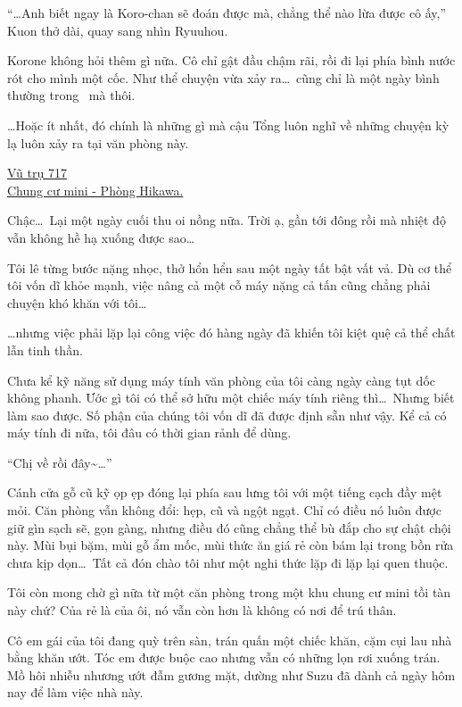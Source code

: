 \documentclass[../main.tex]{subfiles}
\begin{document}
``\dots Anh biết ngay là Koro-chan sẽ đoán được mà, chẳng thể nào lừa được cô ấy,'' Kuon thở dài, quay sang nhìn Ryuuhou.

Korone không hỏi thêm gì nữa. Cô chỉ gật đầu chậm rãi, rồi đi lại phía bình nước rót cho mình một cốc. Như thể chuyện vừa xảy ra\dots\ cũng chỉ là một ngày bình thường trong \hll\ mà thôi.

\dots Hoặc ít nhất, đó chính là những gì mà cậu Tổng luôn nghĩ về những chuyện kỳ lạ luôn xảy ra tại văn phòng này.

\il


\begin{center}
  \uline{Vũ trụ 717\\Chung cư mini - Phòng Hikawa.}
\end{center}


Chậc\dots\ Lại một ngày cuối thu oi nồng nữa. Trời ạ, gần tới đông rồi mà nhiệt độ vẫn không hề hạ xuống được sao\dots

Tôi lê từng bước nặng nhọc, thở hổn hển sau một ngày tất bật vất vả. Dù cơ thể tôi vốn dĩ khỏe mạnh, việc nâng cả một cỗ máy nặng cả tấn cũng chẳng phải chuyện khó khăn với tôi\dots

\dots nhưng việc phải lặp lại công việc đó hàng ngày đã khiến tôi kiệt quệ cả thể chất lẫn tinh thần.

Chưa kể kỹ năng sử dụng máy tính văn phòng của tôi càng ngày càng tụt dốc không phanh. Ước gì tôi có thể sở hữu một chiếc máy tính riêng thì\dots\ Nhưng biết làm sao được. Số phận của chúng tôi vốn dĩ đã được định sẵn như vậy. Kể cả có máy tính đi nữa, tôi đâu có thời gian rảnh để dùng.

``Chị về rồi đây\~{}\dots''

Cánh cửa gỗ cũ kỹ ọp ẹp đóng lại phía sau lưng tôi với một tiếng cạch đầy mệt mỏi. Căn phòng vẫn không đổi: hẹp, cũ và ngột ngạt. Chỉ có điều nó luôn được giữ gìn sạch sẽ, gọn gàng, nhưng điều đó cũng chẳng thể bù đắp cho sự chật chội này. Mùi bụi bặm, mùi gỗ ẩm mốc, mùi thức ăn giá rẻ còn bám lại trong bồn rửa chưa kịp dọn\dots\ Tất cả đón chào tôi như một nghi thức lặp đi lặp lại quen thuộc.

Tôi còn mong chờ gì nữa từ một căn phòng trong một khu chung cư mini tồi tàn này chứ? Của rẻ là của ôi, nó vẫn còn hơn là không có nơi để trú thân.

Cô em gái của tôi đang quỳ trên sàn, trán quấn một chiếc khăn, cặm cụi lau nhà bằng khăn ướt. Tóc em được buộc cao nhưng vẫn có những lọn rơi xuống trán. Mồ hôi nhiễu nhương ướt đẫm gương mặt, dường như Suzu đã dành cả ngày hôm nay để làm việc nhà này.
\end{document}
